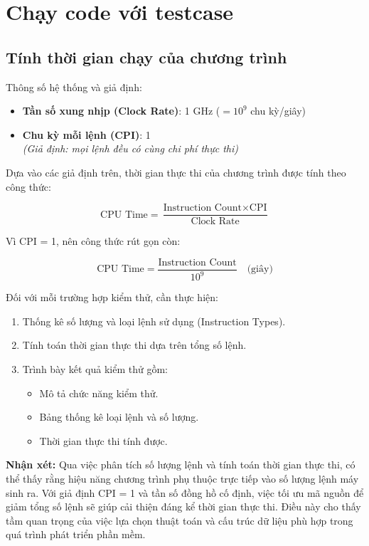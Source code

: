 \section{Chạy code với testcase}
\subsection{Tính thời gian chạy của chương trình}
Thông số hệ thống và giả định:
\begin{itemize}
    \item \textbf{Tần số xung nhịp (Clock Rate)}: 1 GHz ($= 10^9$ chu kỳ/giây)
    \item \textbf{Chu kỳ mỗi lệnh (CPI)}: 1 \\
    \textit{(Giả định: mọi lệnh đều có cùng chi phí thực thi)}
\end{itemize}

\noindent Dựa vào các giả định trên, thời gian thực thi của chương trình được tính theo công thức:

\[
\text{CPU Time} = \frac{\text{Instruction Count} \times \text{CPI}}{\text{Clock Rate}}
\]

Vì CPI = 1, nên công thức rút gọn còn:

\[
\text{CPU Time} = \frac{\text{Instruction Count}}{10^9} \quad \text{(giây)}
\]

\vspace{1em}
Đối với mỗi trường hợp kiểm thử, cần thực hiện:

\begin{enumerate}
    \item Thống kê số lượng và loại lệnh sử dụng (Instruction Types).
    \item Tính toán thời gian thực thi dựa trên tổng số lệnh.
    \item Trình bày kết quả kiểm thử gồm:
    \begin{itemize}
        \item Mô tả chức năng kiểm thử.
        \item Bảng thống kê loại lệnh và số lượng.
        \item Thời gian thực thi tính được.
    \end{itemize}
\end{enumerate}
\vspace{1em}

\noindent \textbf{Nhận xét:} Qua việc phân tích số lượng lệnh và tính toán thời gian thực thi, có thể thấy rằng hiệu năng chương trình phụ thuộc trực tiếp vào số lượng lệnh máy sinh ra. Với giả định CPI = 1 và tần số đồng hồ cố định, việc tối ưu mã nguồn để giảm tổng số lệnh sẽ giúp cải thiện đáng kể thời gian thực thi. Điều này cho thấy tầm quan trọng của việc lựa chọn thuật toán và cấu trúc dữ liệu phù hợp trong quá trình phát triển phần mềm.\\
\newpage

